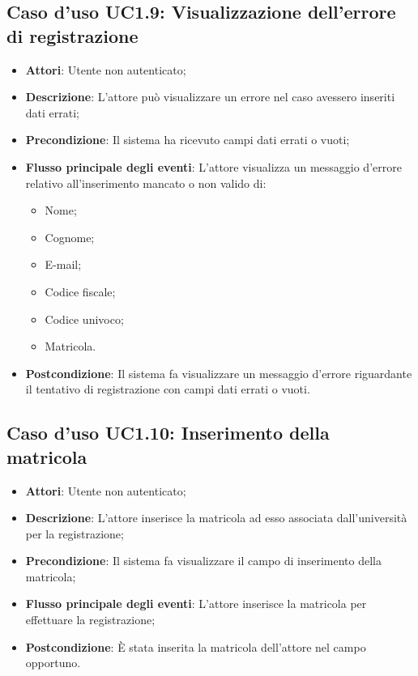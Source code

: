 \subsection{Caso d'uso \texorpdfstring{UC1.9}{UC1.9}: Visualizzazione dell'errore di registrazione}
\begin{itemize}
	\item \textbf{Attori}: Utente non autenticato;
	\item \textbf{Descrizione}: L'attore può visualizzare un errore nel caso avessero inseriti dati errati;
	\item \textbf{Precondizione}: Il sistema ha ricevuto campi dati errati o vuoti;
	\item \textbf{Flusso principale degli eventi}: L'attore visualizza un messaggio d'errore relativo all'inserimento mancato o non valido di:
	\begin{itemize}
		\item Nome;
		\item Cognome;
		\item E-mail;
		\item Codice fiscale;
		\item Codice univoco;
		\item Matricola.
	\end{itemize}
	\item \textbf{Postcondizione}: Il sistema fa visualizzare un messaggio d'errore riguardante il tentativo di registrazione con campi dati errati o vuoti.
\end{itemize}
\subsection{Caso d'uso \texorpdfstring{UC1.10}{UC1.10}: Inserimento della matricola}
\begin{itemize}
	\item \textbf{Attori}: Utente non autenticato;
	\item \textbf{Descrizione}: L'attore inserisce la matricola ad esso associata dall'università per la registrazione;
	\item \textbf{Precondizione}: Il sistema fa visualizzare il campo di inserimento della matricola;
	\item \textbf{Flusso principale degli eventi}: L'attore inserisce la matricola per effettuare la registrazione;
	\item \textbf{Postcondizione}: È stata inserita la matricola dell'attore nel campo opportuno.
\end{itemize}
